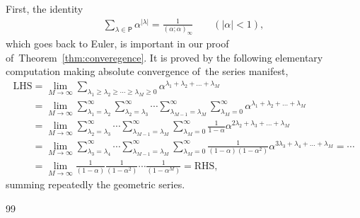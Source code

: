 \documentclass[11pt]{article}
\numberwithin{equation}{section}
\begin{document}
First, the identity
\begin{gather}\label{Euler}
\sum_{\lambda\in\mathsf{P}}\alpha^{|\lambda|} = \frac1{(\alpha;\alpha)_\infty} \qquad (|\alpha|<1),
\end{gather}
which goes back to Euler, is important in our proof of~Theorem~\ref{thm:converegence}. It is proved by the following elementary computation making absolute convergence of~the series manifest,
\begin{gather}
\text{LHS} = \lim_{M\to\infty} \sum_{\lambda_1\geq \lambda_2\geq \cdots\geq \lambda_M\geq 0} \alpha^{\lambda_1+\lambda_2+\dots+\lambda_M}\nonumber
\\ \phantom{\text{LHS}}
{}= \lim_{M\to\infty} \sum_{\lambda_1=\lambda_2}^\infty \sum_{\lambda_2=\lambda_3}^\infty \cdots \sum_{\lambda_{M-1}=\lambda_M}^\infty \sum_{\lambda_M=0}^\infty \alpha^{\lambda_1+\lambda_2+\dots+\lambda_M}\nonumber
\\ \phantom{\text{LHS}}
{}= \lim_{M\to\infty} \sum_{\lambda_2=\lambda_3}^\infty \cdots \sum_{\lambda_{M-1}=\lambda_M}^\infty \sum_{\lambda_M=0}^\infty \frac{1}{1-\alpha}
\alpha^{2\lambda_2+\lambda_3 +\dots+\lambda_M}\nonumber
\\ \phantom{\text{LHS}}
{}= \lim_{M\to\infty} \sum_{\lambda_3=\lambda_4}^\infty \cdots \sum_{\lambda_{M-1}=\lambda_M}^\infty \sum_{\lambda_M=0}^\infty \frac{1}{(1-\alpha)(1-\alpha^2)}
\alpha^{3\lambda_3+\lambda_4 +\dots+\lambda_M} = \cdots \nonumber
\\ \phantom{\text{LHS}}
{}= \lim_{M\to\infty} \frac1{(1-\alpha)} \frac1{(1-\alpha^2)}\cdots \frac1{(1-\alpha^M)} = \text{RHS},
\label{Euler1}
\end{gather}
summing repeatedly the geometric series.
\begin{thebibliography}{99}
\end{thebibliography}
\end{document}

